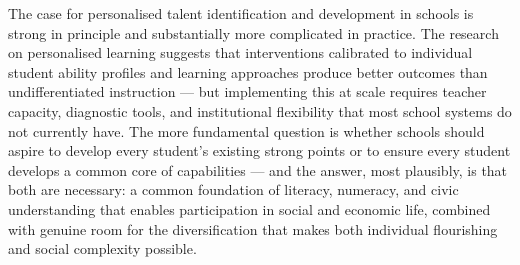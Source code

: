 The case for personalised talent identification and development in schools is strong in principle and substantially more complicated in practice. The research on personalised learning suggests that interventions calibrated to individual student ability profiles and learning approaches produce better outcomes than undifferentiated instruction — but implementing this at scale requires teacher capacity, diagnostic tools, and institutional flexibility that most school systems do not currently have. The more fundamental question is whether schools should aspire to develop every student's existing strong points or to ensure every student develops a common core of capabilities — and the answer, most plausibly, is that both are necessary: a common foundation of literacy, numeracy, and civic understanding that enables participation in social and economic life, combined with genuine room for the diversification that makes both individual flourishing and social complexity possible.

\separator


